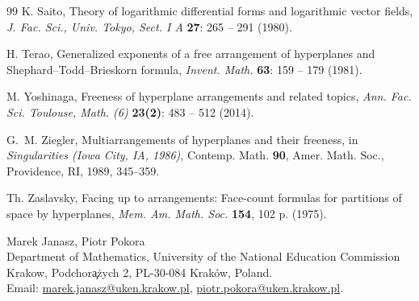 \documentclass[11pt]{article}
\theoremstyle{definition}
\theoremstyle{remark}
\begin{document}
\begin{thebibliography}{99}
K. Saito, Theory of logarithmic differential forms and logarithmic vector fields, \textit{J. Fac. Sci., Univ. Tokyo, Sect. I A} \textbf{27}: 265 -- 291 (1980).

H. Terao, Generalized exponents of a free arrangement of hyperplanes and Shephard--Todd--Brieskorn formula, \textit{Invent. Math.} \textbf{63}: 159 -- 179 (1981).

M. Yoshinaga, Freeness of hyperplane arrangements and related topics,
\textit{Ann. Fac. Sci. Toulouse, Math. (6)} \textbf{23(2)}:  483 -- 512 (2014).

G.~M. Ziegler,
\newblock Multiarrangements of hyperplanes and their freeness,
\newblock in \emph{Singularities (Iowa City, IA, 1986)},
Contemp. Math. \textbf{90}, Amer. Math. Soc., Providence, RI, 1989,
345--359.

Th. Zaslavsky, Facing up to arrangements: Face-count formulas for partitions of space by hyperplanes, \textit{Mem. Am. Math. Soc.} \textbf{154}, 102 p. (1975).

\end{thebibliography}
Marek Janasz, Piotr Pokora\\
\noindent
Department of Mathematics,
University of the National Education Commission Krakow,
Podchor\c a\.zych 2,
PL-30-084 Krak\'ow, Poland. \\
Email: \url{marek.janasz@uken.krakow.pl}, \url{piotr.pokora@uken.krakow.pl}.
\end{document}
